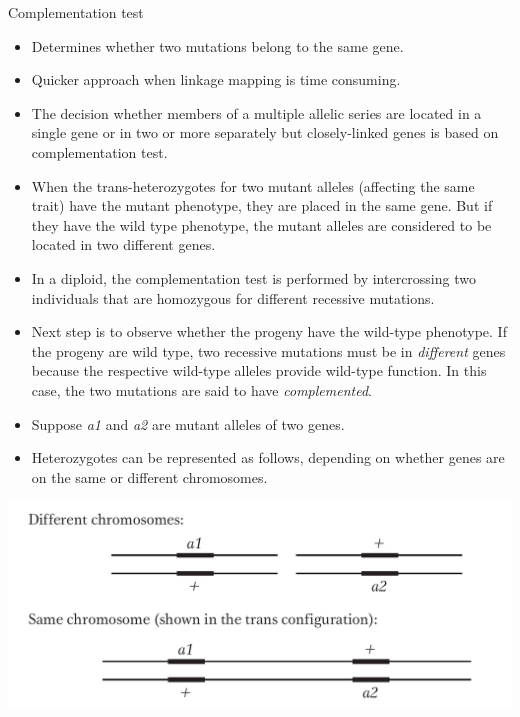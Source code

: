 \documentclass[11pt,dvipsnames,ignorenonframetext,aspectratio=169]{beamer}
\providecommand{\tightlist}{%
  \setlength{\itemsep}{0pt}\setlength{\parskip}{0pt}}
\begin{document}
\begin{frame}{Complementation test}
\protect\hypertarget{complementation-test}{}

\begin{itemize}
\tightlist
\item
  Determines whether two mutations belong to the same gene.
\item
  Quicker approach when linkage mapping is time consuming.
\item
  The decision whether members of a multiple allelic series are located
  in a single gene or in two or more separately but closely-linked genes
  is based on complementation test.
\item
  When the trans-heterozygotes for two mutant alleles (affecting the
  same trait) have the mutant phenotype, they are placed in the same
  gene. But if they have the wild type phenotype, the mutant alleles are
  considered to be located in two different genes.
\end{itemize}

\end{frame}

\begin{frame}{}
\protect\hypertarget{section-28}{}

\begin{itemize}
\tightlist
\item
  In a diploid, the complementation test is performed by intercrossing
  two individuals that are homozygous for different recessive mutations.
\item
  Next step is to observe whether the progeny have the wild-type
  phenotype. If the progeny are wild type, two recessive mutations must
  be in \emph{different} genes because the respective wild-type alleles
  provide wild-type function. In this case, the two mutations are said
  to have \emph{complemented}.
\item
  Suppose \emph{a1} and \emph{a2} are mutant alleles of two genes.
\item
  Heterozygotes can be represented as follows, depending on whether
  genes are on the same or different chromosomes.
\end{itemize}

\begin{center}\includegraphics[width=0.35\linewidth]{./../images/gene_location_chromosomes} \end{center}

\end{frame}
\end{document}
